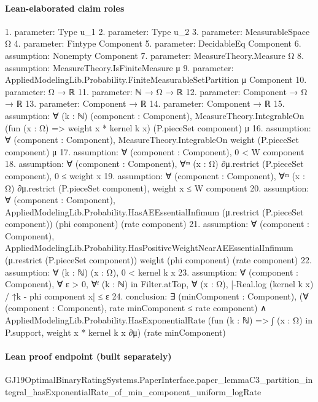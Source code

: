 \documentclass[10pt]{article}
\begin{document}
\paragraph{Lean-elaborated claim roles}\begin{ReviewVerbatim}
1. parameter: Type u_1
2. parameter: Type u_2
3. parameter: MeasurableSpace Ω
4. parameter: Fintype Component
5. parameter: DecidableEq Component
6. assumption: Nonempty Component
7. parameter: MeasureTheory.Measure Ω
8. assumption: MeasureTheory.IsFiniteMeasure μ
9. parameter: AppliedModelingLib.Probability.FiniteMeasurableSetPartition μ Component
10. parameter: Ω → ℝ
11. parameter: ℕ → Ω → ℝ
12. parameter: Component → Ω → ℝ
13. parameter: Component → ℝ
14. parameter: Component → ℝ
15. assumption: ∀ (k : ℕ) (component : Component),
  MeasureTheory.IntegrableOn (fun (x : Ω) => weight x * kernel k x) (P.pieceSet component) μ
16. assumption: ∀ (component : Component), MeasureTheory.IntegrableOn weight (P.pieceSet component) μ
17. assumption: ∀ (component : Component), 0 < W component
18. assumption: ∀ (component : Component), ∀ᵐ (x : Ω) ∂μ.restrict (P.pieceSet component), 0 ≤ weight x
19. assumption: ∀ (component : Component), ∀ᵐ (x : Ω) ∂μ.restrict (P.pieceSet component), weight x ≤ W component
20. assumption: ∀ (component : Component),
  AppliedModelingLib.Probability.HasAEEssentialInfimum (μ.restrict (P.pieceSet component)) (phi component)
    (rate component)
21. assumption: ∀ (component : Component),
  AppliedModelingLib.Probability.HasPositiveWeightNearAEEssentialInfimum (μ.restrict (P.pieceSet component)) weight
    (phi component) (rate component)
22. assumption: ∀ (k : ℕ) (x : Ω), 0 < kernel k x
23. assumption: ∀ (component : Component),
  ∀ ε > 0, ∀ᶠ (k : ℕ) in Filter.atTop, ∀ (x : Ω), |-Real.log (kernel k x) / ↑k - phi component x| ≤ ε
24. conclusion: ∃ (minComponent : Component),
  (∀ (component : Component), rate minComponent ≤ rate component) ∧
    AppliedModelingLib.Probability.HasExponentialRate (fun (k : ℕ) => ∫ (x : Ω) in P.support, weight x * kernel k x ∂μ)
      (rate minComponent)
\end{ReviewVerbatim}

\paragraph{Lean proof endpoint (built separately)}\begin{ReviewVerbatim}
GJ19OptimalBinaryRatingSystems.PaperInterface.paper_lemmaC3_partition_integral_hasExponentialRate_of_min_component_uniform_logRate
\end{ReviewVerbatim}
\end{document}
